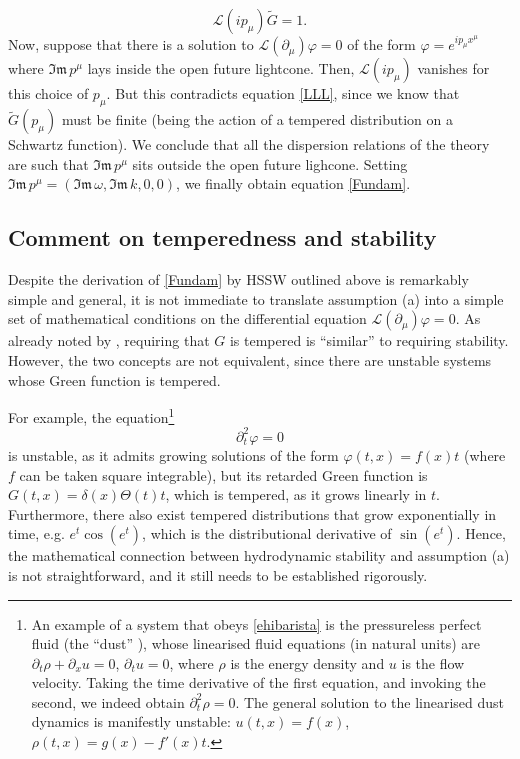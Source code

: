 \documentclass[a4paper, amsfonts, amssymb, amsmath, reprint, showkeys, nofootinbib, twoside,notitlepage]{revtex4-1}
\theoremstyle{definition}
\theoremstyle{theorem}
\theoremstyle{corollary}
\begin{document}
\begin{equation}\label{LLL}
\mathcal{L}(ip_\mu)\tilde{G}=1 .
\end{equation}
Now, suppose that there is a solution to $\mathcal{L}(\partial_\mu)\varphi=0$ of the form $\varphi=e^{ip_\mu x^\mu}$ where $\mathfrak{Im} \, p^\mu$ lays inside the open future lightcone. Then, $\mathcal{L}(ip_\mu)$ vanishes for this choice of $p_\mu$. But this contradicts equation \eqref{LLL}, since we know that $\tilde{G}(p_\mu)$ must be finite (being the action of a tempered distribution on a Schwartz function). We conclude that all the dispersion relations of the theory are such that $\mathfrak{Im} \, p^\mu$ sits outside the open future lighcone. Setting $\mathfrak{Im} \, p^\mu=(\mathfrak{Im} \, \omega,\mathfrak{Im} \, k,0,0)$, we finally obtain equation \eqref{Fundam}.


\subsection{Comment on temperedness and stability}

Despite the derivation of \eqref{Fundam} by HSSW outlined above is remarkably simple and general, it is not immediate to translate assumption (a) into a simple set of mathematical conditions on the differential equation $\mathcal{L}(\partial_\mu)\varphi=0$. As already noted by \cite{Heller2022}, requiring that $G$ is tempered is ``similar'' to requiring stability. However, the two concepts are not equivalent, since there are unstable systems whose Green function is tempered. 

For example, the equation\footnote{An example of a system that obeys \eqref{ehibarista} is the pressureless perfect fluid (the ``dust'' \cite{rezzolla_book}), whose linearised fluid equations (in natural units) are $\partial_t \rho + \partial_x u=0$, $\partial_t u=0$, where $\rho$ is the energy density and $u$ is the flow velocity. Taking the time derivative of the first equation, and invoking the second, we indeed obtain $\partial^2_t \rho=0$. The general solution to the linearised dust dynamics is manifestly unstable: $u(t,x)=f(x)$, $\rho(t,x)=g(x)-f'(x)t$.} 
\begin{equation}\label{ehibarista}
\partial^2_t \varphi=0
\end{equation} 
is unstable, as it admits growing solutions of the form $\varphi(t,x)=f(x) t$ (where $f$ can be taken square integrable), but its retarded Green function is $G(t,x)=\delta(x)\Theta(t) t$, which is tempered, as it grows linearly in $t$. Furthermore, there also exist tempered distributions that grow exponentially in time, e.g. $e^t \cos(e^t)$, which is the distributional derivative of $\sin(e^t)$. Hence, the mathematical connection between hydrodynamic stability and assumption (a) is not straightforward, and it still needs to be established rigorously. 
\end{document}
